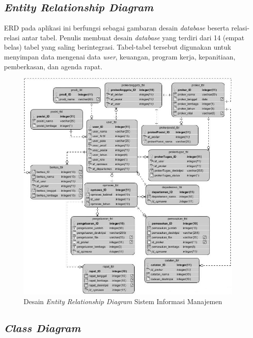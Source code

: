 \subsection{\emph{Entity Relationship Diagram}}

ERD pada aplikasi ini berfungsi sebagai gambaran desain \emph{database} beserta relasi-relasi antar tabel. Penulis membuat desain \textit{database} yang terdiri dari 14 (empat belas) tabel yang saling berintegrasi. Tabel-tabel tersebut digunakan untuk menyimpan data mengenai data \textit{user}, keuangan, program kerja, kepanitiaan, pemberkasan, dan agenda rapat.

\begin{figure}[H]
	\centering
	\includegraphics[width=1.0\textwidth]{gambar/erd}
	\caption{Desain \emph{Entity Relationship Diagram} Sistem Informasi Manajemen}
	\label{entityrelationship_diagram}
\end{figure}

\subsection{\textit{Class Diagram}}

